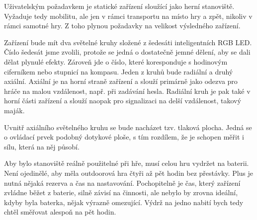 
Uživatelským požadavkem je statické zařízení sloužící jako herní stanoviště.
Vyžaduje tedy mobilitu, ale jen v rámci transportu na místo hry a zpět, nikoliv v rámci samotné hry.
Z toho plynou požadavky na velikost výsledného zařízení.

Zařízení bude mít dva světelné kruhy složené z šedesáti inteligentních RGB LED.
Číslo šedesát jsme zvolili, protože se jedná o dostatečně jemné dělení, aby se dali dělat plynulé efekty.
Zároveň jde o číslo, které koresponduje s hodinovým ciferníkem nebo stupnicí na kompasu.
Jeden z kruhů bude radiální a druhý axiální.
Axiální je na horní straně zařízení a slouží primárně jako odezva pro hráče na malou vzdálenost, např. při zadávání hesla.
Radiální kruh je pak také v horní části zařízení a slouží naopak pro signalizaci na delší vzdálenost, takový maják.

Uvnitř axiálního světelného kruhu se bude nacházet tzv. tlaková plocha.
Jedná se o ovládací prvek podobný dotykové ploše, s tím rozdílem, že je schopen měřit i sílu, která na něj působí.

Aby bylo stanoviště reálně použitelné při hře, musí celou hru vydržet na baterii.
Není ojedinělé, aby měla outdoorová hra čtyři až pět hodin bez přestávky.
Plus je nutná nějaká rezerva a čas na nastavování.
Pochopitelně je čas, který zařízení zvládne běžet z baterie, silně závisí na činnosti, ale nebylo by zrovna ideální, kdyby byla baterka, nějak výrazně omezující.
Výdrž na jedno nabití bych tedy chtěl směřovat alespoň na pět hodin.

